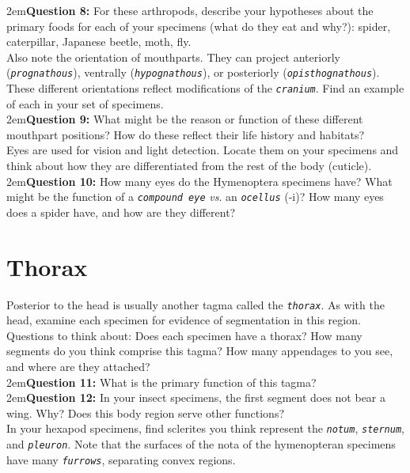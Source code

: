 \documentclass[letterpaper, 11pt]{article}
\newcommand{\latinword}[1]{\texttt{\itshape #1}}%
\begin{document}
\hangindent2em\textbf{Question 8:} For these arthropods,  describe your hypotheses about the primary foods for each of your specimens (what do they eat and why?): spider, caterpillar, Japanese beetle, moth, fly.\\

\noindent{}Also note the orientation of mouthparts. They can project anteriorly (\latinword{prognathous}), ventrally (\latinword{hypognathous}), or posteriorly (\latinword{opisthognathous}). These different orientations reflect modifications of the \latinword{cranium}. Find an example of each in your set of specimens. \\

\hangindent2em\textbf{Question 9:} What might be the reason or function of these different mouthpart positions? How do these reflect their life history and habitats?\\

\noindent{}Eyes are used for vision and light detection. Locate them on your specimens and think about how they are differentiated from the rest of the body (cuticle).\\

\hangindent2em\textbf{Question 10:} How many eyes do the Hymenoptera specimens have? What might be the function of a \latinword{compound eye} \textit{vs}. an \latinword{ocellus} (-i)? How many eyes does a spider have, and how are they different?\\

\section{Thorax}
Posterior to the head is usually another tagma called the  \latinword{thorax}. As with the head, examine each specimen for evidence of segmentation in this region. Questions to think about: Does each specimen have a thorax? How many segments do you think comprise this tagma? How many appendages to you see, and where are they attached?\\

\hangindent2em\textbf{Question 11:} What is the primary function of this tagma? \\

\hangindent2em\textbf{Question 12:} In your insect specimens, the first segment does not bear a wing. Why? Does this body region serve other functions?\\

\noindent{}In your hexapod specimens, find sclerites you think represent the \latinword{notum}, \latinword{sternum}, and \latinword{pleuron}. Note that the surfaces of the nota of the hymenopteran specimens have many \latinword{furrows}, separating convex regions.\\
\end{document}
